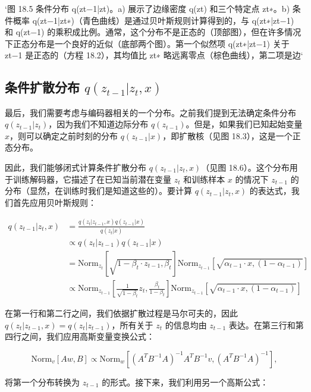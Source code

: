 `图 18.5 条件分布 q(zt−1|zt)。a) 展示了边缘密度 q(zt) 和三个特定点 zt∗。b) 条件概率 q(zt−1|zt∗)（青色曲线）是通过贝叶斯规则计算得到的，与 q(zt∗|zt−1) 和 q(zt−1) 的乘积成比例。通常，这个分布不是正态的（顶部图），但在许多情况下正态分布是一个良好的近似（底部两个图）。第一个似然项 q(zt∗|zt−1) 关于 zt−1 是正态的（方程 18.2），其均值比 zt∗ 略远离零点（棕色曲线），第二项是边`


\subsection{条件扩散分布 \(q(z_{t-1}|z_t, x)\)}
最后，我们需要考虑与编码器相关的一个分布。之前我们提到无法确定条件分布 \(q(z_{t-1}|z_t)\)，因为我们不知道边际分布 \(q(z_{t-1})\)。但是，如果我们已知起始变量 \(x\)，则可以确定之前时刻的分布 \(q(z_{t-1}|x)\)，即扩散核（见图 18.3），这是一个正态分布。

因此，我们能够闭式计算条件扩散分布 \(q(z_{t-1}|z_t, x)\)（见图 18.6）。这个分布用于训练解码器，它描述了在已知当前潜在变量 \(z_t\) 和训练样本 \(x\) 的情况下 \(z_{t-1}\) 的分布（显然，在训练时我们是知道这些的）。要计算 \(q(z_{t-1}|z_t, x)\) 的表达式，我们首先应用贝叶斯规则：



\begin{align}
q(z_{t-1}|z_t, x) &= \frac{q(z_t|z_{t-1}, x)q(z_{t-1}|x)}{q(z_t|x)} \\
&\propto q(z_t|z_{t-1})q(z_{t-1}|x) \\
&= \text{Norm}_{z_t} \left[ \sqrt{1 - \beta_t \cdot z_{t-1}, \beta_t} \right] \text{Norm}_{z_{t-1}} \left[ \sqrt{\alpha_{t-1} \cdot x, (1 - \alpha_{t-1})} \right] \\
&\propto \text{Norm}_{z_{t-1}} \left[ \frac{1}{\sqrt{1 - \beta_t}} z_t, \frac{\beta_t}{1 - \beta_t} \right] \text{Norm}_{z_{t-1}} \left[ \sqrt{\alpha_{t-1} \cdot x, (1 - \alpha_{t-1})} \right] 
\end{align} 


在第一行和第二行之间，我们依据扩散过程是马尔可夫的，因此 \(q(z_t|z_{t-1}, x) = q(z_t|z_{t-1})\)，所有关于 \(z_t\) 的信息均由 \(z_{t-1}\) 表达。在第三行和第四行之间，我们应用高斯变量变换公式：

\begin{equation}
\text{Norm}_{v} [Aw, B] \propto \text{Norm}_{w} \left[ (A^T B^{-1} A)^{-1} A^T B^{-1} v, (A^T B^{-1} A)^{-1} \right], 
\end{equation}

将第一个分布转换为 \(z_{t-1}\) 的形式。接下来，我们利用另一个高斯公式：

